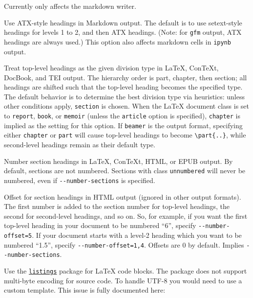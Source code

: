 \begin{description}
Currently only affects the markdown writer.
\item[\texttt{-\/-atx-headers}]
Use ATX-style headings in Markdown output. The default is to use
setext-style headings for levels 1 to 2, and then ATX headings. (Note:
for \texttt{gfm} output, ATX headings are always used.) This option also
affects markdown cells in \texttt{ipynb} output.
\item[\texttt{-\/-top-level-division={[}default\textbar{}section\textbar{}chapter\textbar{}part{]}}]
Treat top-level headings as the given division type in LaTeX, ConTeXt,
DocBook, and TEI output. The hierarchy order is part, chapter, then
section; all headings are shifted such that the top-level heading
becomes the specified type. The default behavior is to determine the
best division type via heuristics: unless other conditions apply,
\texttt{section} is chosen. When the LaTeX document class is set to
\texttt{report}, \texttt{book}, or \texttt{memoir} (unless the
\texttt{article} option is specified), \texttt{chapter} is implied as
the setting for this option. If \texttt{beamer} is the output format,
specifying either \texttt{chapter} or \texttt{part} will cause top-level
headings to become \texttt{\textbackslash{}part\{..\}}, while
second-level headings remain as their default type.
\item[\texttt{-N}, \texttt{-\/-number-sections}]
Number section headings in LaTeX, ConTeXt, HTML, or EPUB output. By
default, sections are not numbered. Sections with class
\texttt{unnumbered} will never be numbered, even if
\texttt{-\/-number-sections} is specified.
\item[\texttt{-\/-number-offset=}\emph{NUMBER}{[}\texttt{,}\emph{NUMBER}\texttt{,}\emph{\ldots{}}{]}]
Offset for section headings in HTML output (ignored in other output
formats). The first number is added to the section number for top-level
headings, the second for second-level headings, and so on. So, for
example, if you want the first top-level heading in your document to be
numbered ``6'', specify \texttt{-\/-number-offset=5}. If your document
starts with a level-2 heading which you want to be numbered ``1.5'',
specify \texttt{-\/-number-offset=1,4}. Offsets are 0 by default.
Implies \texttt{-\/-number-sections}.
\item[\texttt{-\/-listings}]
Use the \href{https://ctan.org/pkg/listings}{\texttt{listings}} package
for LaTeX code blocks. The package does not support multi-byte encoding
for source code. To handle UTF-8 you would need to use a custom
template. This issue is fully documented here:

\end{description}
